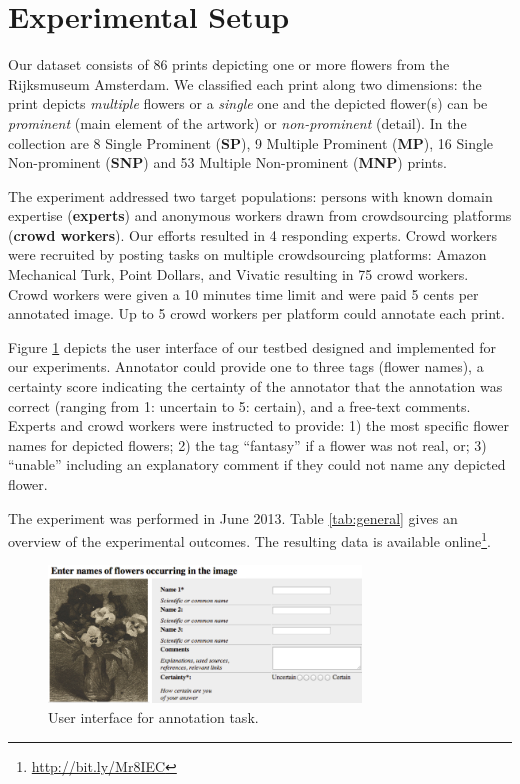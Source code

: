 \documentclass{sig-alternate-2013}
\begin{document}
\section{Experimental Setup}
Our dataset consists of 86 prints depicting one or more flowers from the Rijksmuseum Amsterdam. We classified each print along two dimensions: the print depicts \textit{multiple} flowers or a \textit{single} one and the depicted flower(s) can be \textit{prominent} (main element of the artwork) or \textit{non-prominent} (detail). In the collection are 8 Single Prominent (\textbf{SP}), 9 Multiple Prominent (\textbf{MP}), 16 Single Non-prominent (\textbf{SNP}) and 53 Multiple Non-prominent (\textbf{MNP}) prints.

The experiment addressed two target populations: persons with known domain expertise (\textbf{experts}) and anonymous workers drawn from crowdsourcing platforms (\textbf{crowd workers}). Our efforts resulted in 4 responding experts. Crowd workers were recruited by posting tasks on multiple crowdsourcing platforms: Amazon Mechanical Turk, Point Dollars, and Vivatic resulting in 75 crowd workers. Crowd workers were given a 10 minutes time limit and were paid 5 cents per annotated image. Up to 5 crowd workers per platform could annotate each print.

Figure \ref{fig:ui} depicts the user interface of our testbed designed and implemented for our experiments. Annotator could provide one to three tags (flower names), a certainty score indicating the certainty of the annotator that the annotation was correct (ranging from 1: uncertain to 5: certain), and a free-text comments. Experts and crowd workers were instructed to provide: 1) the most specific flower names for depicted flowers; 2) the tag ``fantasy'' if a flower was not real, or; 3) ``unable'' including an explanatory comment if they could not name any depicted flower.

The experiment was performed in June 2013. Table \ref{tab:general} gives an overview of the experimental outcomes. The resulting data is available online\footnote{\url{http://bit.ly/Mr8IEC}}.

\begin{figure}[t]
\includegraphics[height=3.65cm,natwidth=791,natheight=347]{ui.png}
\caption{User interface for annotation task.}
\label{fig:ui}
\end{figure}
\end{document}
